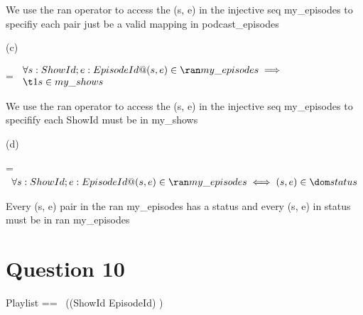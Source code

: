\documentclass[a4paper,10pt,fleqn]{article}
\begin{document}
\bigskip


\bigskip

\setlength{\leftskip}{\dimexpr\parindent+2em\relax}
\noindent We use the ran operator to access the (s, e) in the injective seq my\_episodes to specifiy each pair just be a valid mapping in podcast\_episodes

\bigskip

\setlength{\leftskip}{0pt}
\medskip

\noindent\hspace*{\parindent}(c)

\setlength{\leftskip}{\dimexpr\parindent+2em\relax}
\savedleftskip=\leftskip
\noindent
$\displaystyle
\begin{array}{l}
\forall s : ShowId; e : EpisodeId @ (s, e) \in \ran my\_episodes \implies \\
\t1 s \in my\_shows
\end{array}$

\bigskip


\bigskip

\setlength{\leftskip}{\dimexpr\parindent+2em\relax}
\noindent We use the ran operator to access the (s, e) in the injective seq my\_episodes to specifify each ShowId must be in my\_shows

\bigskip

\setlength{\leftskip}{0pt}
\medskip

\noindent\hspace*{\parindent}(d)

\setlength{\leftskip}{\dimexpr\parindent+2em\relax}
\savedleftskip=\leftskip
\noindent
$\displaystyle
\begin{array}{l}
\forall s : ShowId; e : EpisodeId @ (s, e) \in \ran my\_episodes \iff (s, e) \in \dom status
\end{array}$

\bigskip


\bigskip

\setlength{\leftskip}{\dimexpr\parindent+2em\relax}
\noindent Every (s, e) pair in the ran my\_episodes has a status and every (s, e) in status must be in ran my\_episodes

\bigskip

\setlength{\leftskip}{0pt}
\section*{Question 10}

\begin{zed}
Playlist == \seq~((ShowId \cross EpisodeId) \cross \nat)
\end{zed}
\end{document}
